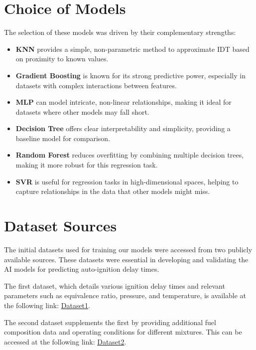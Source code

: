 \documentclass[12pt]{report}
\begin{document}
\section{Choice of Models}

The selection of these models was driven by their complementary strengths:
\begin{itemize}
    \item \textbf{KNN} provides a simple, non-parametric method to approximate IDT based on proximity to known values.
    \item \textbf{Gradient Boosting} is known for its strong predictive power, especially in datasets with complex interactions between features.
    \item \textbf{MLP} can model intricate, non-linear relationships, making it ideal for datasets where other models may fall short.
    \item \textbf{Decision Tree} offers clear interpretability and simplicity, providing a baseline model for comparison.
    \item \textbf{Random Forest} reduces overfitting by combining multiple decision trees, making it more robust for this regression task.
    \item \textbf{SVR} is useful for regression tasks in high-dimensional spaces, helping to capture relationships in the data that other models might miss.
\end{itemize}
\section{Dataset Sources}

The initial datasets used for training our models were accessed from two publicly available sources. These datasets were essential in developing and validating the AI models for predicting auto-ignition delay times.

The first dataset, which details various ignition delay times and relevant parameters such as equivalence ratio, pressure, and temperature, is available at the following link: \href{https://docs.google.com/spreadsheets/d/15vkRc_eLdfHFcyxG_xD-NQmos7kWV1x8/edit?usp=sharing&ouid=110942553828710394435&rtpof=true&sd=true}{Dataset1}.

The second dataset supplements the first by providing additional fuel composition data and operating conditions for different mixtures. This can be accessed at the following link: \href{https://docs.google.com/spreadsheets/d/1ycSi_3ev-iRUcElNEmSm_K87B3LwD7vZ/edit?usp=sharing&ouid=110942553828710394435&rtpof=true&sd=true}{Dataset2}.
\end{document}
